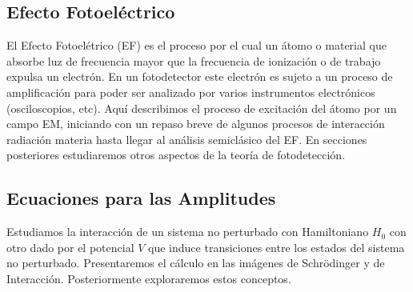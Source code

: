 \documentclass[twocolumn,aps,eqsecnum]{revtex4}
\begin{document}
\subsection{Efecto Fotoel\'ectrico} 
El Efecto Fotoel\'etrico (EF) es el proceso por el cual un \'atomo o material 
que absorbe luz de frecuencia mayor que la frecuencia de ionizaci\'on o de 
trabajo expulsa un electr\'on. En un fotodetector este electr\'on es sujeto a 
un proceso de amplificaci\'on para poder ser analizado por varios 
instrumentos electr\'onicos (osciloscopios, etc).  Aqu\'i describimos el proceso 
de excitaci\'on del \'atomo por un campo EM, iniciando con un repaso breve 
de algunos procesos de interacci\'on radiaci\'on materia hasta llegar al 
an\'alisis semicl\'asico del EF. En secciones posteriores estudiaremos otros 
aspectos de la teor\'ia de fotodetecci\'on. 

\subsection{Ecuaciones para las Amplitudes} 
Estudiamos la interacci\'on de un sistema no perturbado con Hamiltoniano 
$H_0$ con otro dado por el potencial $V$ que induce transiciones entre los 
estados del sistema no perturbado.  Presentaremos el c\'alculo en las 
im\'agenes de Schr\"odinger y de Interacci\'on. Posteriormente exploraremos 
estos conceptos. 
\end{document}
